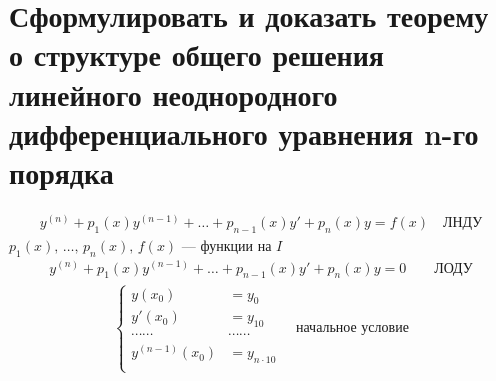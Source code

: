 \section{Сформулировать и доказать теорему о структуре общего решения линейного неоднородного дифференциального уравнения n-го порядка}
\setcounter{equation}{0}
\begin{gather}
    y^{(n)} + p_1(x)y^{(n-1)} + \ldots + p_{n-1}(x) y' + p_n(x) y = f(x)\quad \text{ЛНДУ}
\end{gather}
$p_1(x),\, \ldots,\, p_n(x),\, f(x)$ --- функции на $I$
\begin{gather}
    y^{(n)} + p_1(x)y^{(n-1)} + \ldots + p_{n-1}(x) y' + p_n(x) y = 0\qquad \text{ЛОДУ}
\end{gather}
\begin{gather}
    \left\{ \begin{aligned}
        y(x_0) &= y_0 \\
        y'(x_0) &= y_{10} \\
        \cdots\cdots&\cdots\cdots \\
        y^{(n-1)}(x_0) &= y_{n\cdot10} \\
    \end{aligned} \right.\quad \text{начальное условие}
\end{gather}

